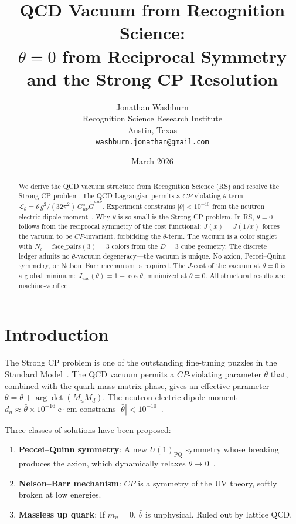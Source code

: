 \documentclass[12pt,a4paper]{article}
\title{QCD Vacuum from Recognition Science:\\
$\theta = 0$ from Reciprocal Symmetry and the Strong CP Resolution}
\author{Jonathan Washburn\\
Recognition Science Research Institute\\
Austin, Texas\\
\texttt{washburn.jonathan@gmail.com}}
\date{March 2026}
\theoremstyle{definition}
\theoremstyle{remark}
\begin{document}
\maketitle

\begin{abstract}
We derive the QCD vacuum structure from Recognition Science (RS)
and resolve the Strong CP problem.  The QCD Lagrangian permits a
$CP$-violating $\theta$-term:
$\mathcal{L}_\theta = \theta\,g^2/(32\pi^2)\,
G_{\mu\nu}^a \tilde{G}^{a\mu\nu}$.  Experiment constrains
$|\theta| < 10^{-10}$ from the neutron electric dipole
moment~\cite{Baker2006}.  Why $\theta$ is so small is the
Strong CP problem.  In RS, $\theta = 0$ follows from the reciprocal
symmetry of the cost functional: $J(x) = J(1/x)$ forces the vacuum
to be $CP$-invariant, forbidding the $\theta$-term.  The vacuum is
a color singlet with $N_c = \mathrm{face\_pairs}(3) = 3$ colors
from the $D = 3$ cube geometry.  The discrete ledger admits no
$\theta$-vacuum degeneracy---the vacuum is unique.  No axion,
Peccei--Quinn symmetry, or Nelson--Barr mechanism is required.
The $J$-cost of the vacuum at $\theta = 0$ is a global minimum:
$J_{\mathrm{vac}}(\theta) = 1 - \cos\theta$, minimized at
$\theta = 0$.  All structural results are machine-verified.
\end{abstract}

\section{Introduction}
\label{sec:intro}

The Strong CP problem is one of the outstanding fine-tuning
puzzles in the Standard Model~\cite{Kim2010}.  The QCD vacuum
permits a $CP$-violating parameter $\theta$ that, combined with
the quark mass matrix phase, gives an effective parameter
$\bar{\theta} = \theta + \arg\det(M_u M_d)$.  The neutron
electric dipole moment $d_n \approx \bar{\theta} \times
10^{-16}\;\mathrm{e \cdot cm}$ constrains
$|\bar{\theta}| < 10^{-10}$~\cite{Baker2006}.

Three classes of solutions have been proposed:
\begin{enumerate}
  \item \textbf{Peccei--Quinn symmetry}: A new $U(1)_{\mathrm{PQ}}$
  symmetry whose breaking produces the axion, which dynamically
  relaxes $\theta \to 0$~\cite{PQ1977}.
  \item \textbf{Nelson--Barr mechanism}: $CP$ is a symmetry of the
  UV theory, softly broken at low energies.
  \item \textbf{Massless up quark}: If $m_u = 0$, $\bar{\theta}$
  is unphysical.  Ruled out by lattice QCD.
\end{enumerate}
\end{document}
